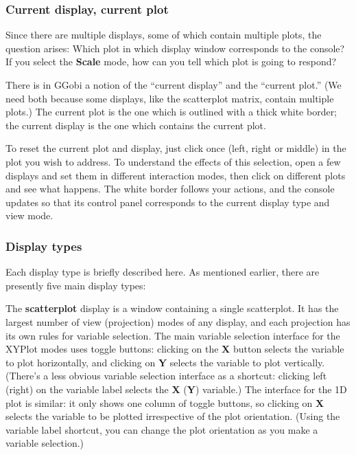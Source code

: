 \documentclass[11pt]{article}
\def\Widget#1{\textbf{#1}}
\begin{document}
\subsubsection{Current display, current plot}

Since there are multiple displays, some of which contain multiple
plots, the question arises:  Which plot in which display window
corresponds to the console?  If you select the \Widget{Scale} mode,
how can you tell which plot is going to respond?

There is in GGobi a notion of the ``current display'' and the
``current plot.''  (We need both because some displays, like the
scatterplot matrix, contain multiple plots.) The current plot is the
one which is outlined with a thick white border; the current display
is the one which contains the current plot.

To reset the current plot and display, just click once (left, right or
middle) in the plot you wish to address.  To understand the effects of
this selection, open a few displays and set them in different
interaction modes, then click on different plots and see what happens.
The white border follows your actions, and the console updates so that
its control panel corresponds to the current display type and view
mode.

\subsubsection{Display types}
\label{DisplayTypes}

Each display type is briefly described here. 
As mentioned earlier, there are presently five main display types:


The \Widget{scatterplot} display is a window containing a single
scatterplot.  It has the largest number of view (projection) modes of
any display, and each projection has its own rules for variable
selection.  The main variable selection interface for the XYPlot modes
uses toggle buttons: clicking on the \Widget{X} button selects the
variable to plot horizontally, and clicking on \Widget{Y} selects the
variable to plot vertically.  (There's a less obvious variable
selection interface as a shortcut: clicking left (right) on the
variable label selects the \Widget{X} (\Widget{Y}) variable.)  The
interface for the 1D plot is similar: it only shows one column of
toggle buttons, so clicking on \Widget{X} selects the variable to be
plotted irrespective of the plot orientation.  (Using the variable
label shortcut, you can change the plot orientation as you make a
variable selection.)
\end{document}
